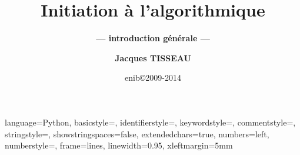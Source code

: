 


\newtheorem{rem}{Remarque}[section]
\newtheorem{defin}{Définition}[section]
\newtheorem{td}{\color{blue}TD}[section]

\lstset
{
language=Python,
basicstyle=\ttfamily,
identifierstyle=\ttfamily,
keywordstyle=\color{blue}\ttfamily,
commentstyle=\color{gray}\ttfamily,
stringstyle=\color{green}\ttfamily,
showstringspaces=false,
extendedchars=true,
numbers=left, 
numberstyle=\tiny,
frame=lines,
linewidth=0.95\textwidth,
xleftmargin=5mm
} 

\def\exo#1{\mbox{}\ \hfill\mbox{\color{blue}$\rule{2mm}{2mm}\,$\footnotesize\sc TD\ref{#1}}}
\def\exercice#1#2{\mbox{}\ \ TD \ref{#1}\ #2\ \dotfill\ \pageref{#1}\mbox{}}

\newenvironment{py}[1]{\begin{minipage}[t]{#1}\footnotesize}{\end{minipage}}

\title[Algorithmique]{\bf Initiation à l'algorithmique}
\subtitle{\bf --- introduction générale ---}

\author[\tt jacques.tisseau@enib.fr]{\large\bf Jacques TISSEAU}
\institute[\enib]{{\large\enib--\cerv}}
\date[enib\copyright 2009-2014]{\footnotesize enib\copyright 2009-2014}

\graphicspath{{../../fig/}}




